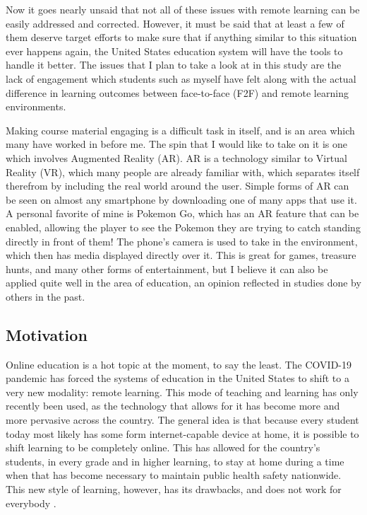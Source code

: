 \documentclass[sigconf]{acmart}
\begin{document}
Now it goes nearly unsaid that not all of these issues with remote learning can be easily addressed and corrected. However, it must be said that at least a few of them deserve target efforts to make sure that if anything similar to this situation ever happens again, the United States education system will have the tools to handle it better. The issues that I plan to take a look at in this study are the lack of engagement which students such as myself have felt along with the actual difference in learning outcomes between face-to-face (F2F) and remote learning environments.

Making course material engaging is a difficult task in itself, and is an area which many have worked in before me. The spin that I would like to take on it is one which involves Augmented Reality (AR). AR is a technology similar to Virtual Reality (VR), which many people are already familiar with, which separates itself therefrom by including the real world around the user. Simple forms of AR can be seen on almost any smartphone by downloading one of many apps that use it. A personal favorite of mine is Pokemon Go, which has an AR feature that can be enabled, allowing the player to see the Pokemon they are trying to catch standing directly in front of them! The phone's camera is used to take in the environment, which then has media displayed directly over it. This is great for games, treasure hunts, and many other forms of entertainment, but I believe it can also be applied quite well in the area of education, an opinion reflected in studies done by others in the past.

\subsection{Motivation}
Online education is a hot topic at the moment, to say the least. The COVID-19 pandemic has forced the systems of education in the United States to shift to a very new modality: remote learning. This mode of teaching and learning has only recently been used, as the technology that allows for it has become more and more pervasive across the country. The general idea is that because every student today most likely has some form internet-capable device at home, it is possible to shift learning to be completely online. This has allowed for the country's students, in every grade and in higher learning, to stay at home during a time when that has become necessary to maintain public health safety nationwide. This new style of learning, however, has its drawbacks, and does not work for everybody \cite{kearsley02}.
\end{document}
